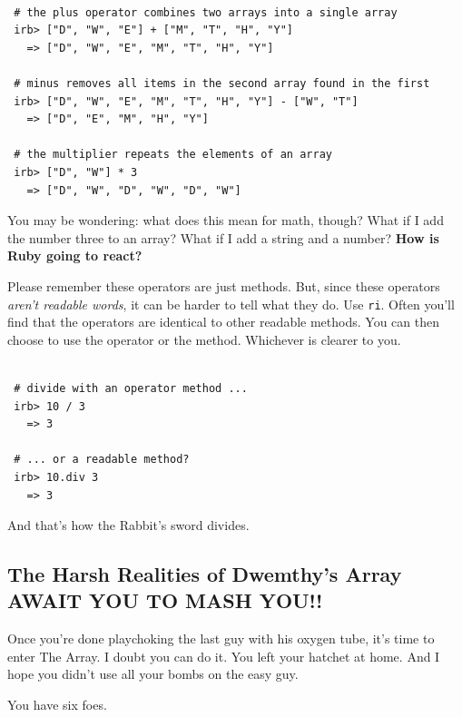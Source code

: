 \documentclass[10pt,twoside]{report}
\begin{document}
\begin{lstlisting}

 # the plus operator combines two arrays into a single array
 irb> ["D", "W", "E"] + ["M", "T", "H", "Y"]
   => ["D", "W", "E", "M", "T", "H", "Y"]

 # minus removes all items in the second array found in the first
 irb> ["D", "W", "E", "M", "T", "H", "Y"] - ["W", "T"]
   => ["D", "E", "M", "H", "Y"]

 # the multiplier repeats the elements of an array
 irb> ["D", "W"] * 3
   => ["D", "W", "D", "W", "D", "W"]

\end{lstlisting}


You may be wondering: what does this mean for math, though?  What if I
add the number three to an array?  What if I add a string and a
number?  {\bf How is Ruby going to react?}

Please remember these operators are just methods.  But, since these
operators {\em aren't readable words}, it can be harder to tell what
they do.  Use \lstinline[breaklines=true]|ri|.  Often you'll find that
the operators are identical to other readable methods.  You can then
choose to use the operator or the method. Whichever is clearer to you.


\begin{lstlisting}

 # divide with an operator method ...
 irb> 10 / 3
   => 3

 # ... or a readable method?
 irb> 10.div 3
   => 3

\end{lstlisting}


And that's how the Rabbit's sword divides.



\subsection{The Harsh Realities of Dwemthy's Array AWAIT YOU TO MASH YOU!!}



Once you're done playchoking the last guy with his oxygen tube, it's
time to enter The Array.  I doubt you can do it.  You left your
hatchet at home.  And I hope you didn't use all your bombs on the easy
guy.

You have six foes.
\end{document}
